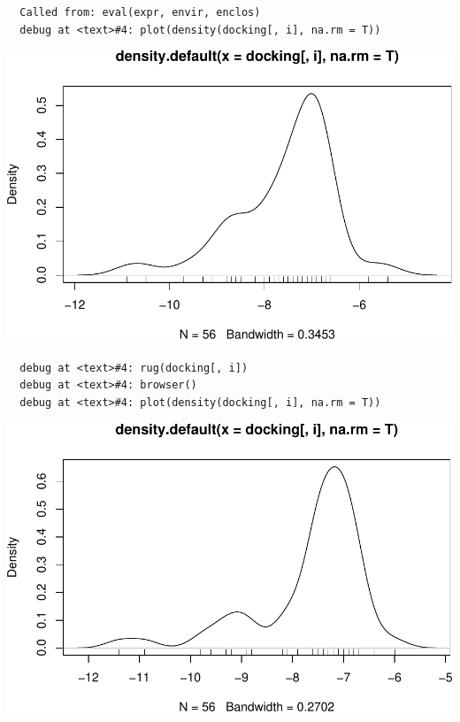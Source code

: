 \documentclass[12pt,twoside]{reedthesis}
\begin{document}
  \begin{verbatim}
  Called from: eval(expr, envir, enclos)
  debug at <text>#4: plot(density(docking[, i], na.rm = T))
  \end{verbatim}
  
  \begin{center}\includegraphics{tesis_files/figure-latex/johan-2} \end{center}
  
  \begin{verbatim}
  debug at <text>#4: rug(docking[, i])
  debug at <text>#4: browser()
  debug at <text>#4: plot(density(docking[, i], na.rm = T))
  \end{verbatim}
  
  \begin{center}\includegraphics{tesis_files/figure-latex/johan-3} \end{center}
  
\end{document}
